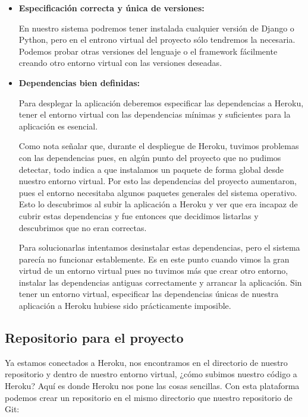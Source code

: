 \begin{itemize}
    \item \textbf{Especificación correcta y única de versiones:}
    
    \bigskip
    En nuestro sistema podremos tener instalada cualquier versión de Django o Python, pero en el entrono  virtual del proyecto sólo tendremos la necesaria. Podemos probar otras versiones del lenguaje o el framework fácilmente creando otro entorno virtual con las versiones deseadas.
    
    \item \textbf{Dependencias bien definidas:}

    \bigskip
    Para desplegar la aplicación deberemos especificar las dependencias a Heroku, tener el entorno virtual con las dependencias mínimas y suficientes para la aplicación es esencial.
    
    \bigskip
    Como nota señalar que, durante el despliegue de Heroku, tuvimos problemas con las dependencias pues, en algún punto del proyecto que no pudimos detectar, todo indica a que instalamos un paquete de forma global desde nuestro entorno virtual. Por esto las dependencias del proyecto aumentaron, pues el entorno necesitaba algunos paquetes generales del sistema operativo. Esto lo descubrimos al subir la aplicación a Heroku y ver que era incapaz de cubrir estas dependencias y fue entonces que decidimos listarlas y descubrimos que no eran correctas.
    
    \bigskip
    Para solucionarlas intentamos desinstalar estas dependencias, pero el sistema parecía no funcionar establemente. Es en este punto cuando vimos la gran virtud de un entorno virtual pues no tuvimos más que crear otro entorno, instalar las dependencias antiguas correctamente y arrancar la aplicación.
    Sin tener un entorno virtual, especificar las dependencias únicas de nuestra aplicación a Heroku hubiese sido prácticamente imposible.
\end{itemize}


\subsection{Repositorio para el proyecto}
  
  Ya estamos conectados a Heroku, nos encontramos en el directorio de nuestro repositorio y dentro de nuestro entorno virtual, ¿cómo subimos nuestro código a Heroku? Aquí es donde Heroku nos pone las cosas sencillas. Con esta plataforma podemos crear un repositorio en el mismo directorio que nuestro repositorio de Git:
  
